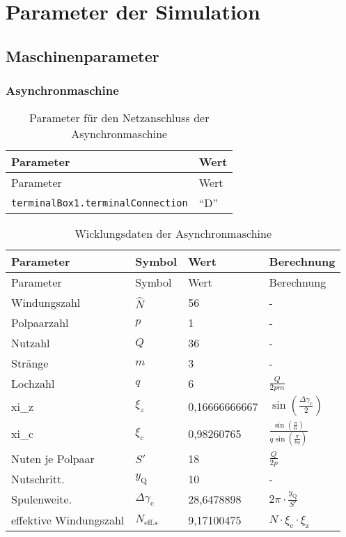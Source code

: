 \chapter{Parameter der Simulation}
\label{chap:ParameterDerSimulation}

\section{Maschinenparameter}\label{sec:maschinenparameter}

\subsection{Asynchronmaschine}\label{subsec:asynchronmaschine}

\begin{longtable}[]{@{}ll@{}}
\caption{Parameter für den Netzanschluss der
Asynchronmaschine}\tabularnewline
\toprule
Parameter & Wert\tabularnewline
\midrule
\endfirsthead
\toprule
Parameter & Wert\tabularnewline
\midrule
\endhead
\texttt{terminalBox1.terminalConnection} & ``D''\tabularnewline
\bottomrule
\end{longtable}

\begin{longtable}[]{@{}llll@{}}
\caption{Wicklungsdaten der Asynchronmaschine}\label{tab:WicklungsdatenASM}\tabularnewline
\toprule
Parameter              & Symbol                    & Wert          & Berechnung\tabularnewline
\midrule
\endfirsthead
\toprule
Parameter              & Symbol                    & Wert          & Berechnung\tabularnewline
\midrule
\endhead
Windungszahl           & $\hat N$                  & 56            & -\tabularnewline
Polpaarzahl            & $p$                       & 1             & -\tabularnewline
Nutzahl                & $Q$                       & 36            & -\tabularnewline
Stränge                & $m$                       & 3             & -\tabularnewline
Lochzahl               & $q$                       & 6             & $\frac{Q}{2pm}$\tabularnewline
xi\_z                  & $\xi_z$                   & 0,16666666667 & $\sin(\frac{\Delta\gamma _{\mathrm{c}}}{2})$\tabularnewline
xi\_c                  & $\xi_c$                   & 0,98260765    & $\frac{\sin(\frac{\pi}{6})}{q\sin(\frac{\pi}{6q})}$\tabularnewline
Nuten je Polpaar       & $S'$                      & 18            & $\frac{Q}{2p}$\tabularnewline
Nutschritt.            & $y_\mathrm{Q}$            & 10            & -\tabularnewline
Spulenweite.           & $\Delta\gamma_\mathrm{c}$ & 28,6478898    & $2\pi\cdot\frac{y_\mathrm{Q}}{S'}$\tabularnewline
effektive Windungszahl & $N_\mathrm{eff.s}$        & 9,17100475    & $\hat N\cdot\xi_\mathrm{c}\cdot\xi_\mathrm{z}$\tabularnewline
\bottomrule
\end{longtable}

